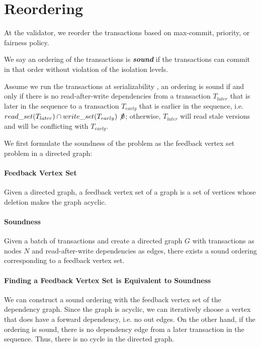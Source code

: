 \section{Reordering}

At the validator, we reorder the transactions based on max-commit, priority, or fairness policy.

We say an ordering of the transactions is \textbf{\emph{sound}} if the transactions can commit in that order without violation of the isolation levels.

Assume we run the transactions at serializability , an ordering is sound if and only if there is no read-after-write dependencies from a transaction $T_{later}$ that is later in the sequence to a transaction $T_{early}$ that is earlier in the sequence, i.e. $read\_set(T_{later})\cap write\_set(T_{early})\not\emptyset$; otherwise, $T_{later}$ will read stale versions and will be conflicting with $T_{early}$. 

We first formulate the soundness of the problem as the feedback vertex
set problem  in a directed graph:

\paragraph{Feedback Vertex Set} Given a directed graph, a feedback vertex set of a graph is a set of vertices whose deletion makes the graph acyclic.

\paragraph{Soundness} Given a batch of transactions and create a directed graph $G$ with transactions as nodes $N$ and read-after-write dependencies as edges, there exists a sound ordering corresponding to a feedback vertex set. 

\paragraph{Finding a Feedback Vertex Set is Equivalent to Soundness} 
We can construct a sound ordering with the feedback vertex set of the dependency graph. 
Since the graph is acyclic, we can iteratively choose a vertex that does have a forward dependency, i.e. no out edges.
On the other hand, if the ordering is sound, there is no dependency edge from a later transaction in the sequence. 
Thus, there is no cycle in the directed graph. 

